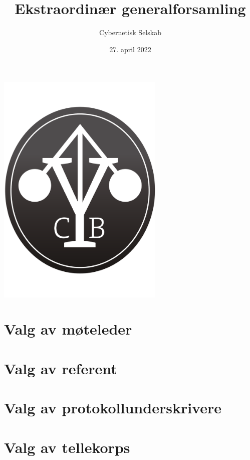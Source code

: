 \documentclass[10pt,norsk,a4paper,usenames,dvipsnames]{article}
\title{\huge Ekstraordinær generalforsamling}
\author{\LARGE Cybernetisk Selskab}
\date{27. april 2022}
\begin{document}
\maketitle



\begin{center}


\includegraphics[width=0.6\textwidth,height=0.6\textheight,keepaspectratio=true]{cyblogoa3.pdf}

\end{center}


\newpage


\tableofcontents

\section{Valg av møteleder}


\section{Valg av referent}


\section{Valg av protokollunderskrivere}


\section{Valg av tellekorps}
\end{document}
